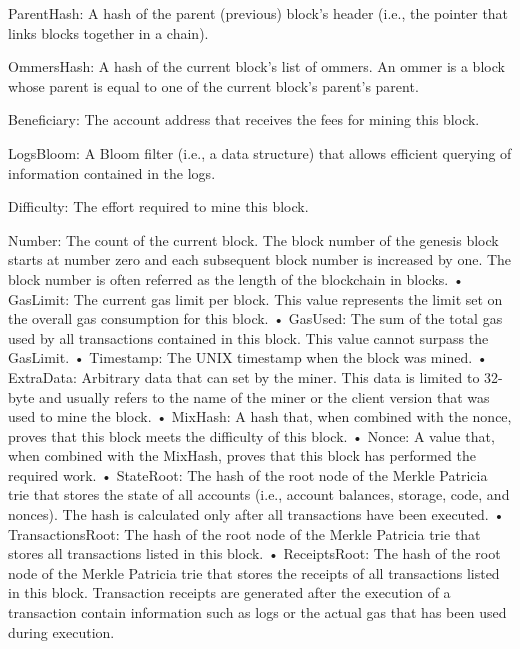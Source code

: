         ParentHash: A hash of the parent (previous) block’s header (i.e., the pointer that links blocks together in a chain).

        OmmersHash: A hash of the current block’s list of ommers. An ommer is a block whose parent is equal to one of the current block’s parent’s parent.

        Beneficiary: The account address that receives the fees for mining this block.

        LogsBloom: A Bloom filter (i.e., a data structure) that allows efficient querying of information contained in the logs.

        Difficulty: The effort required to mine this block.

        Number: The count of the current block. The block number of the genesis block starts at number zero and each subsequent block number is increased by one. The block number is often referred as the length of the blockchain in blocks. • GasLimit: The current gas limit per block. This value represents the limit set on the overall gas consumption for this block. • GasUsed: The sum of the total gas used by all transactions contained in this block. This value cannot surpass the GasLimit. • Timestamp: The UNIX timestamp when the block was mined. • ExtraData: Arbitrary data that can set by the miner. This data is limited to 32-byte and usually refers to the name of the miner or the client version that was used to mine the block. • MixHash: A hash that, when combined with the nonce, proves that this block meets the difficulty of this block. • Nonce: A value that, when combined with the MixHash, proves that this block has performed the required work. • StateRoot: The hash of the root node of the Merkle Patricia trie that stores the state of all accounts (i.e., account balances, storage, code, and nonces). The hash is calculated only after all transactions have been executed. • TransactionsRoot: The hash of the root node of the Merkle Patricia trie that stores all transactions listed in this block. • ReceiptsRoot: The hash of the root node of the Merkle Patricia trie that stores the receipts of all transactions listed in this block. Transaction receipts are generated after the execution of a transaction contain information such as logs or the actual gas that has been used during execution.


